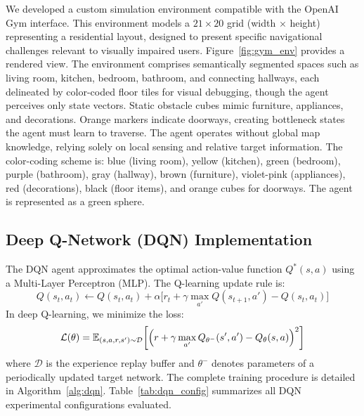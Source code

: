 \documentclass{article}
\begin{document}
We developed a custom simulation environment compatible with the OpenAI Gym
interface. This environment models a $21 \times 20$ grid (width $\times$ height)
representing a residential layout, designed to present specific navigational
challenges relevant to visually impaired users. Figure~\ref{fig:gym_env} provides
a rendered view. The environment comprises semantically segmented spaces such as
living room, kitchen, bedroom, bathroom, and connecting hallways, each delineated
by color-coded floor tiles for visual debugging, though the agent perceives only
state vectors. Static obstacle cubes mimic furniture, appliances, and decorations.
Orange markers indicate doorways, creating bottleneck states the agent must learn
to traverse. The agent operates without global map knowledge, relying solely on
local sensing and relative target information. The color-coding scheme is: blue
(living room), yellow (kitchen), green (bedroom), purple (bathroom), gray
(hallway), brown (furniture), violet-pink (appliances), red (decorations), black
(floor items), and orange cubes for doorways. The agent is represented as a green
sphere.

\subsection{Deep Q-Network (DQN) Implementation}

The DQN agent approximates the optimal action-value function $Q^*(s,a)$ using a
Multi-Layer Perceptron (MLP). The Q-learning update rule is:
\begin{equation}
    Q(s_t,a_t) \leftarrow Q(s_t,a_t) + \alpha\bigl[r_t + \gamma
    \max_{a'} Q(s_{t+1},a') - Q(s_t,a_t)\bigr]
\end{equation}
In deep Q-learning, we minimize the loss:
\begin{equation}
    \mathcal{L}(\theta) = \mathbb{E}_{(s,a,r,s') \sim \mathcal{D}}\!\left[
    \Bigl(r + \gamma \max_{a'} Q_{\theta^-}(s',a') -
    Q_\theta(s,a)\Bigr)^2\right]
\end{equation}
where $\mathcal{D}$ is the experience replay buffer and $\theta^-$ denotes
parameters of a periodically updated target network. The complete training
procedure is detailed in Algorithm~\ref{alg:dqn}. Table~\ref{tab:dqn_config}
summarizes all DQN experimental configurations evaluated.
\end{document}
